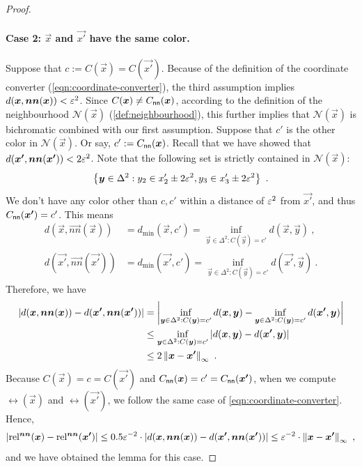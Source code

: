 \begin{proof}
    \paragraph{Case 2: $\vec{x}$ and $\vec{x'}$ have the same color.}
    Suppose that $c:=C(\vec{x})=C(\vec{x'})$.
    Because of the definition of the coordinate converter (\cref{eqn:coordinate-converter}), the third assumption implies $d(\vec{x}, \vec{nn}(\vec{x}))<\eps^2$.
    Since $C(\vec{x})\neq C_{\sf nn}(\vec{x})$, according to the definition of the neighbourhood $\mathcal{N}(\vec{x})$ (\cref{def:neighbourhood}), this further implies that $\mathcal{N}(\vec{x})$ is bichromatic combined with our first assumption.
    Suppose that $c'$ is the other color in $\mathcal{N}(\vec{x})$. 
    Or say, $c':=C_{\sf nn}(\vec{x})$. 
    Recall that we have showed that $d(\vec{x'}, \nn(\vec{x'}))<2\eps^{2}$.
    Note that the following set is strictly contained in $\mathcal{N}(\vec{x})$:
    \begin{align*}
        \set{\vec{y}\in \Delta^2: y_2\in x'_2\pm 2\eps^2, y_3\in x'_3\pm 2\eps^2}~.
    \end{align*}
    We don't have any color other than $c,c'$ within a distance of $\eps^2$ from $\vec{x'}$, and thus $C_{\sf nn}(\vec{x'}) =  c'$.
    This means 
    \begin{align*}
        d(\vec{x}, \vec{nn}(\vec{x})) &= d_{\min}(\vec{x}, c') = \inf_{\vec{y}\in \Delta^2: C(\vec{y})=c'} d(\vec{x}, \vec{y})~,\\
        d(\vec{x'}, \vec{nn}(\vec{x'})) &= d_{\min}(\vec{x'}, c') = \inf_{\vec{y}\in \Delta^2: C(\vec{y})=c'} d(\vec{x'}, \vec{y})~.
    \end{align*}
    Therefore, we have
    \begin{align*}
        \abs{d(\vec{x}, \vec{nn}(\vec{x}))-d(\vec{x'}, \vec{nn}(\vec{x'}))} &= \abs{\inf_{\vec{y}\in \Delta^2: C(\vec{y})=c'} d(\vec{x}, \vec{y}) - \inf_{\vec{y}\in \Delta^2: C(\vec{y})=c'} d(\vec{x'}, \vec{y})}
        \\
        &\leq \inf_{\vec{y}\in \Delta^2: C(\vec{y})=c'} \abs{d(\vec{x}, \vec{y})-d(\vec{x'},\vec{y})}
        \\
        &\leq 2\norm{\vec{x}-\vec{x'}}{\infty}~.
    \end{align*}
    Because $C(\vec{x})=c=C(\vec{x'})$ and $C_{\sf nn}(\vec{x}) = c' = C_{\sf nn}(\vec{x'})$, when we compute $\rel(\vec{x})$ and $\rel(\vec{x'})$, we follow the same case of \cref{eqn:coordinate-converter}. 
    Hence, 
    \begin{align*}
        \abs{\rel(\vec{x}) - \rel(\vec{x'})} \leq 0.5\eps^{-2} \cdot \abs{d(\vec{x}, \vec{nn}(\vec{x}))-d(\vec{x'}, \vec{nn}(\vec{x'}))} \leq \eps^{-2} \cdot \norm{\vec{x}-\vec{x'}}{\infty}~,
    \end{align*}
    and we have obtained the lemma for this case.
\end{proof}

